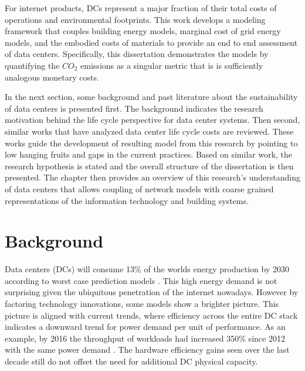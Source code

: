     For internet products, DCs represent a major fraction of their total costs of operations and environmental footprints.  This work develops a modeling framework that couples building energy models, marginal cost of grid energy models, and the embodied costs of materials to provide an end to end assessment of data centers. Specifically, this dissertation demonstrates the models by quantifying the $CO_2$ emissions as a singular metric that is is sufficiently analogous monetary costs.
    
    In the next section, some background and past literature about the sustainability of data centers is presented first. The background indicates the research motivation behind the life cycle perspective for data center systems. Then second, similar works that have analyzed data center life cycle costs are reviewed. These works guide the development of resulting model from this research by pointing to low hanging fruits and gaps in the current practices. Based on similar work, the research hypothesis is stated and the overall structure of the dissertation is then presented. The chapter then provides an overview of this research's understanding of data centers that allows coupling of network models with coarse grained representations of the information technology and building systems.   

\section{Background}

    Data centers (DCs) will consume 13\% of the worlds energy production by 2030 according to worst case prediction models \cite{andrae15}. This high energy demand is not surprising given the ubiquitous penetration of the internet nowadays. However by factoring technology innovations, some models show a brighter picture. This picture is aligned with current trends, where efficiency across the entire DC stack indicates a downward trend for power demand per unit of performance. As an example, by 2016 the throughput of workloads had increased 350\% since 2012 with the same power demand \cite{GoogleEnvRpt}.  The hardware efficiency gains seen over the last decade still do not offset the need for additional DC physical capacity.
    
